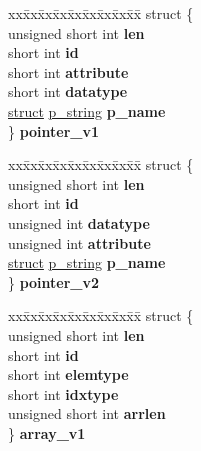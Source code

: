 \begin{DoxyCompactItemize}
\begin{tabbing}
\end{tabbing}\item 
\mbox{\label{unioncodeview__type_a1940a0d2d65cb60777b78b15049499fa}} 
\begin{tabbing}
xx\=xx\=xx\=xx\=xx\=xx\=xx\=xx\=xx\=\kill
struct \{\\
\>unsigned short int {\bfseries len}\\
\>short int {\bfseries id}\\
\>short int {\bfseries attribute}\\
\>short int {\bfseries datatype}\\
\>\hyperlink{interfacestruct}{struct} \hyperlink{structp__string}{p\_string} {\bfseries p\_name}\\
\} {\bfseries pointer\_v1}\\

\end{tabbing}\item 
\mbox{\label{unioncodeview__type_a19985cc5981177dcb7ad92cbbdde2e14}} 
\begin{tabbing}
xx\=xx\=xx\=xx\=xx\=xx\=xx\=xx\=xx\=\kill
struct \{\\
\>unsigned short int {\bfseries len}\\
\>short int {\bfseries id}\\
\>unsigned int {\bfseries datatype}\\
\>unsigned int {\bfseries attribute}\\
\>\hyperlink{interfacestruct}{struct} \hyperlink{structp__string}{p\_string} {\bfseries p\_name}\\
\} {\bfseries pointer\_v2}\\

\end{tabbing}\item 
\mbox{\label{unioncodeview__type_a61123d82a083cfdf2cddeff695048b6f}} 
\begin{tabbing}
xx\=xx\=xx\=xx\=xx\=xx\=xx\=xx\=xx\=\kill
struct \{\\
\>unsigned short int {\bfseries len}\\
\>short int {\bfseries id}\\
\>short int {\bfseries elemtype}\\
\>short int {\bfseries idxtype}\\
\>unsigned short int {\bfseries arrlen}\\
\} {\bfseries array\_v1}\\


\end{tabbing}
\end{DoxyCompactItemize}
